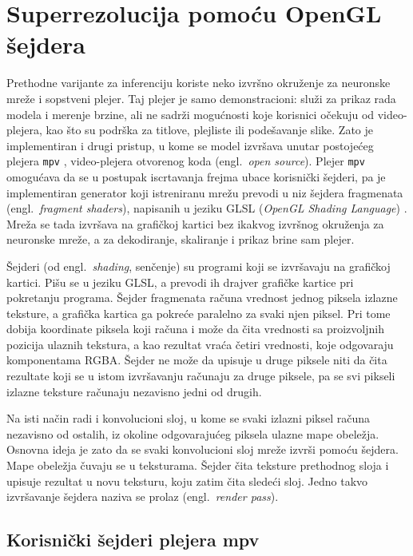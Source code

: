 \documentclass[12pt,a4paper]{article}
\begin{document}
\section{Superrezolucija pomoću OpenGL šejdera}
\label{sec:gl_sejderi}

Prethodne varijante za inferenciju koriste neko izvršno okruženje za neuronske mreže i sopstveni plejer. Taj plejer je samo demonstracioni: služi za prikaz rada modela i merenje brzine, ali ne sadrži mogućnosti koje korisnici očekuju od video-plejera, kao što su podrška za titlove, plejliste ili podešavanje slike. Zato je implementiran i drugi pristup, u kome se model izvršava unutar postojećeg plejera \texttt{mpv} \cite{mpv}, video-plejera otvorenog koda (engl.\ \textit{open source}). Plejer \texttt{mpv} omogućava da se u postupak iscrtavanja frejma ubace korisnički šejderi, pa je implementiran generator koji istreniranu mrežu prevodi u niz šejdera fragmenata (engl.\ \textit{fragment shaders}), napisanih u jeziku GLSL (\textit{OpenGL Shading Language}) \cite{GLSL}. Mreža se tada izvršava na grafičkoj kartici bez ikakvog izvršnog okruženja za neuronske mreže, a za dekodiranje, skaliranje i prikaz brine sam plejer.

Šejderi (od engl.\ \textit{shading}, senčenje) su programi koji se izvršavaju na grafičkoj kartici. Pišu se u jeziku GLSL, a prevodi ih drajver grafičke kartice pri pokretanju programa. Šejder fragmenata računa vrednost jednog piksela izlazne teksture, a grafička kartica ga pokreće paralelno za svaki njen piksel. Pri tome dobija koordinate piksela koji računa i može da čita vrednosti sa proizvoljnih pozicija ulaznih tekstura, a kao rezultat vraća četiri vrednosti, koje odgovaraju komponentama RGBA. Šejder ne može da upisuje u druge piksele niti da čita rezultate koji se u istom izvršavanju računaju za druge piksele, pa se svi pikseli izlazne teksture računaju nezavisno jedni od drugih.

Na isti način radi i konvolucioni sloj, u kome se svaki izlazni piksel računa nezavisno od ostalih, iz okoline odgovarajućeg piksela ulazne mape obeležja. Osnovna ideja je zato da se svaki konvolucioni sloj mreže izvrši pomoću šejdera. Mape obeležja čuvaju se u teksturama. Šejder čita teksture prethodnog sloja i upisuje rezultat u novu teksturu, koju zatim čita sledeći sloj. Jedno takvo izvršavanje šejdera naziva se prolaz (engl.\ \textit{render pass}).

\subsection{Korisnički šejderi plejera mpv}
\end{document}
